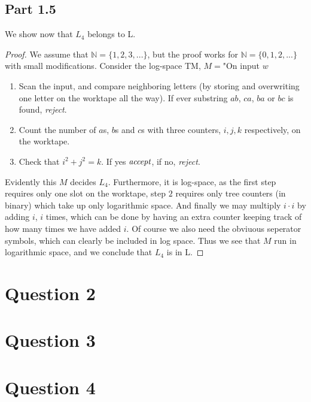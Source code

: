 \documentclass[a4paper,11pt]{article}
\newcommand{\N}{\mathbb{N}}
\numberwithin{equation}{section}
\begin{document}
	\subsection*{Part 1.5}
	We show now that $ L_4 $ belongs to L.
	\begin{proof}
	We assume that $ \N=\{1,2,3,...\} $, but the proof works for $ \N=\{0,1,2,...\} $ with small modifications. Consider the log-space TM, $ M= $"On input $ w $\begin{enumerate}
			\item Scan the input, and compare neighboring letters (by storing and overwriting one letter on the worktape all the way). If ever substring $ ab $, $ ca $, $ ba $ or $ bc $ is found, \emph{reject}.
			\item Count the number of $ a $s, $ b $s and $ c $s with three counters, $ i,j,k $ respectively, on the worktape. 
			\item Check that $ i^2+j^2=k $. If yes $ \emph{accept} $, if no, \emph{reject}.		
			\end{enumerate}
			Evidently this $ M $ decides $ L_4 $. Furthermore, it is log-space, as the first step requires only one slot on the worktape, step $ 2 $ requires only tree counters (in binary) which take up only logarithmic space. And finally we may multiply $ i\cdot i $ by adding $ i $, $ i $ times, which can be done by having an extra counter keeping track of how many times we have added $ i $. Of course we also need the obviuous seperator symbols, which can clearly be included in log space. Thus we see that $ M $ run in logarithmic space, and we conclude that $ L_4 $ is in L.
	\end{proof}
	\section*{Question 2}
	
	
	\section*{Question 3}
	
	
	\section*{Question 4}
	
\end{document}
